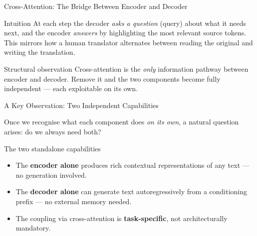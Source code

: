 \documentclass[aspectratio=169]{beamer}
\begin{document}
%
%
\begin{frame}{Cross-Attention: The Bridge Between Encoder and Decoder}
\begin{exampleblock}{Intuition}
  At each step the decoder \emph{asks a question} (query) about what
  it needs next, and the encoder \emph{answers} by highlighting the
  most relevant source tokens.  This mirrors how a human translator
  alternates between reading the original and writing the translation.
\end{exampleblock}

\medskip
\begin{alertblock}{Structural observation}
  Cross-attention is the \emph{only} information pathway between encoder
  and decoder.  Remove it and the two components become fully independent
  --- each exploitable on its own.
\end{alertblock}

\end{frame}
%
%
\begin{frame}{A Key Observation: Two Independent Capabilities}

Once we recognise what each component does \emph{on its own},
a natural question arises: do we always need both?

\medskip
\begin{block}{The two standalone capabilities}
  \begin{itemize}
    \item The \textbf{encoder alone} produces rich contextual
          representations of any text --- no generation involved.
    \item The \textbf{decoder alone} can generate text
          autoregressively from a conditioning prefix --- no external
          memory needed.
    \item The coupling via cross-attention is \textbf{task-specific},
          not architecturally mandatory.
  \end{itemize}
\end{block}
\end{frame}
%
%
\end{document}
